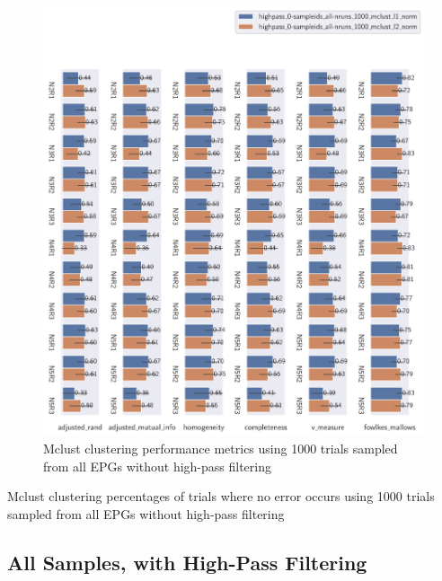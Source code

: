 \begin{theappendices}
\begin{figure}[H]
\centering
\includegraphics[width=\textwidth]{./figures/clust_comparison/highpass_0-sampleids_all-nruns_1000_mclust.pdf}
\caption{Mclust clustering performance metrics using 1000 trials sampled from all EPGs without high-pass filtering}
\label{fig:highpass_0-sampleids_all-nruns_1000_mclust}
\end{figure}

\begin{table}[H]
\centering
{}
\caption{Mclust clustering percentages of trials where no error occurs using 1000 trials sampled from all EPGs without high-pass filtering}
\label{table:highpass_0-sampleids_all-nruns_1000_mclust}
\end{table}

\subsection{All Samples, with High-Pass Filtering}


\end{theappendices}
